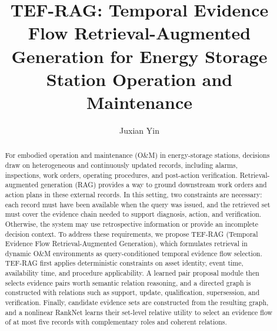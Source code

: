 \documentclass[letterpaper,10pt,conference]{IEEEtran}
\title{TEF-RAG: Temporal Evidence Flow Retrieval-Augmented Generation for Energy Storage Station Operation and Maintenance}
\author{Juxian Yin}
\begin{document}
\maketitle

\begin{abstract}
For embodied operation and maintenance (O\&M) in energy-storage stations, decisions draw on heterogeneous and continuously updated records, including alarms, inspections, work orders, operating procedures, and post-action verification. Retrieval-augmented generation (RAG) provides a way to ground downstream work orders and action plans in these external records.
In this setting, two constraints are necessary: each record must have been available when the query was issued, and the retrieved set must cover the evidence chain needed to support diagnosis, action, and verification. Otherwise, the system may use retrospective information or provide an incomplete decision context.
To address these requirements, we propose TEF-RAG (Temporal Evidence Flow Retrieval-Augmented Generation), which formulates retrieval in dynamic O\&M environments as query-conditioned temporal evidence flow selection.
% 
TEF-RAG first applies deterministic constraints on asset identity, event time, availability time, 
and procedure applicability. 
% 
A learned pair proposal module then selects evidence pairs worth semantic relation reasoning, and a directed graph is constructed with relations such as support, update, qualification, supersession, and verification. 
% 
Finally, candidate evidence sets are constructed from the resulting graph, and a nonlinear RankNet learns their set-level relative utility to select an evidence flow of at most five records with complementary roles and coherent relations.

\end{abstract}
\end{document}
